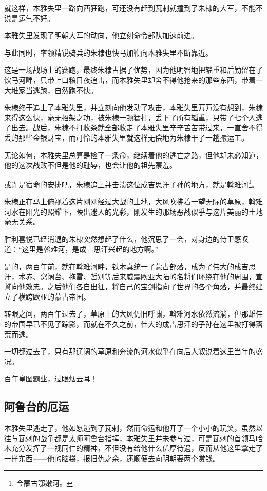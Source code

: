 \begin{multicols}{\theparacolNo}
就这样，本雅失里一路向西狂跑，可还没有赶到瓦剌就撞到了朱棣的大军，不能不说是运气不好。

本雅失里发现了明朝大军的动向，他立刻命令部队加速前进。

与此同时，率领精锐骑兵的朱棣也快马加鞭向本雅失里不断靠近。

这是一场战场上的赛跑，最终朱棣占据了优势，因为他明智地把辎重和后勤留在了饮马河畔，只带上口粮日夜追击，而本雅失里却舍不得他抢来的那些东西，带着一大堆家当逃跑，自然跑不快。

朱棣终于追上了本雅失里，并立刻向他发动了攻击，本雅失里万万没有想到，朱棣来得这么快，毫无招架之功，被朱棣一顿猛打，丢下了所有辎重，只带了七个人逃了出去。战后，朱棣不打收条就全部收走了本雅失里辛辛苦苦带过来，一直舍不得丢的那些金银财宝，而可怜的本雅失里就这样无偿地为朱棣干了一趟搬运工。

无论如何，本雅失里总算是捡了一条命，继续着他的逃亡之路，但他却未必知道，他的这次战败不但是他的耻辱，也会让他的祖先蒙羞。

或许是宿命的安排吧，朱棣追上并击溃这位成吉思汗子孙的地方，就是斡难河\footnote{今蒙古鄂嫩河。}。

朱棣正在马上俯视着这片刚刚经过大战的土地，大风吹拂着一望无际的草原，斡难河水在阳光的照耀下，映出迷人的光彩，刚发生的那场恶战似乎与这片美丽的土地毫无关系。

胜利喜悦已经消退的朱棣突然想起了什么，他沉思了一会，对身边的侍卫感叹道：“这里是斡难河，是成吉思汗兴起的地方啊。”

是的，两百年前，就在斡难河畔，铁木真统一了蒙古部落，成为了伟大的成吉思汗，术赤、窝阔台、拖雷、哲别等后来威震欧亚大陆的名将们环绕在他的周围，宣誓向他效忠。之后他们各自出征，将自己的宝剑指向了世界的各个角落，并最终建立了横跨欧亚的蒙古帝国。

转眼之间，两百年过去了，草原上的大风仍旧呼啸，斡难河水依然流淌，但那雄伟的帝国早已不见了踪影，而就在不久之前，伟大的成吉思汗的子孙在这里被打得落荒而逃。

一切都过去了，只有那辽阔的草原和奔流的河水似乎在向后人叙说着这里当年的盛况。

百年皇图霸业，过眼烟云耳！

\subsection{阿鲁台的厄运}
本雅失里逃走了，他如愿逃到了瓦剌，然而命运和他开了一个小小的玩笑，虽然以往与瓦剌的战争都是太师阿鲁台指挥，本雅失里并未参与过，可是瓦剌的首领马哈木充分发挥了一视同仁的精神，不但没有给他什么优厚待遇，反而从他这里拿走了一样东西——他的脑袋，报旧仇之余，还顺便去向明朝要两个赏钱。


\end{multicols}
